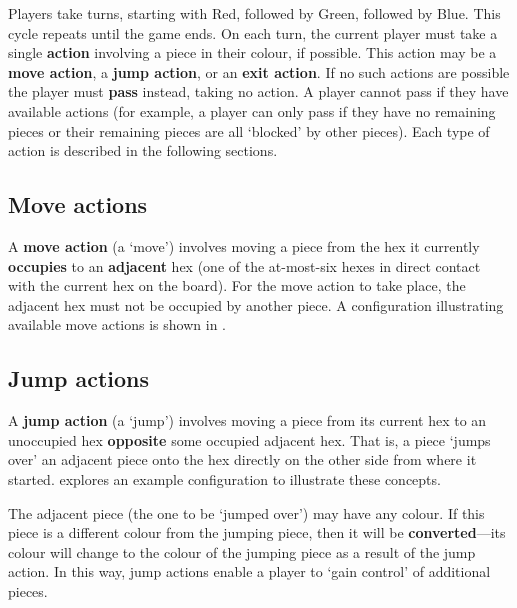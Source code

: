 \documentclass[]{article}
\begin{document}
Players take turns, starting with Red, followed by Green, followed by
Blue. This cycle repeats until the game ends. On each turn, the current
player must take a single \textbf{action} involving a piece in their
colour, if possible. This action may be a \textbf{move action}, a
\textbf{jump action}, or an \textbf{exit action}.
%
If no such actions are possible the player must \textbf{pass} instead,
taking no action. A player cannot pass if they have available actions
(for example, a player can only pass if they have no remaining pieces or
their remaining pieces are all `blocked' by other pieces).
Each type of action is described in the following sections.

\subsection*{Move actions}

A \textbf{move action} (a `move') involves moving a piece from the hex
it currently \textbf{occupies} to an \textbf{adjacent} hex (one of the
at-most-six hexes in direct contact with the current hex on the board).
For the move action to take place, the adjacent hex must not be occupied
by another piece. A configuration illustrating available move actions is
shown in .

\subsection*{Jump actions}

A \textbf{jump action} (a `jump') involves moving a piece from its
current hex to an unoccupied hex \textbf{opposite} some occupied
adjacent hex. That is, a piece `jumps over' an adjacent piece onto the
hex directly on the other side from where it started. 
explores an example configuration to illustrate these concepts.

The adjacent piece (the one to be `jumped over') may have any colour. If
this piece is a different colour from the jumping piece, then it will be
\textbf{converted}---its colour will change to the colour of the jumping
piece as a result of the jump action. In this way, jump actions enable a
player to `gain control' of additional pieces.
\end{document}
